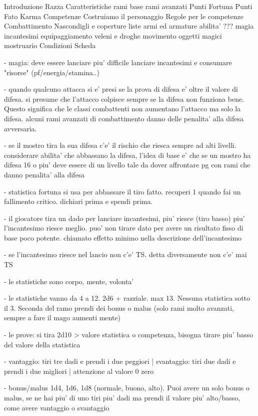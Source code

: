\documentclass[12pt,a4paper,twoside,openany,twocolumn]{book}
\begin{document}
Introduzione
Razza
Caratteristiche
rami base
rami avanzati
Punti Fortuna
Punti Fato
Karma
Competenze
Costruiamo il personaggio
Regole per le competenze
Combattimento
Nascondigli e coperture
liste armi ed armature
abilita' ???
magia
incantesimi
equipaggiamento
veleni e droghe
movimento
oggetti magici
mostruario
Condizioni
Scheda

- magia: deve essere lanciare piu' difficile lanciare incantesimi e consumare "risorse" (pf/energia/stamina..)

- quando qualcuno attacca si e' presi se la prova di difesa e' oltre il valore di difesa. si presume che l'attacco colpisce sempre se la difesa non funziona bene. Questo significa che le classi combattenti non aumentano l'attacco ma solo la difesa. alcuni rami avanzati di combattimento danno delle penalita' alla difesa avversaria.

- se il mostro tira la sua difesa c'e' il rischio che riesca sempre ad alti livelli. considerare abilita' che abbassano la difesa, l'idea di base e' che se un mostro ha difesa 16 o piu' deve essere di un livello tale da dover affrontare pg con rami che danno penalita' alla difesa

- statistica fortuna si usa per abbassare il tiro fatto. recuperi 1 quando fai un fallimento critico. dichiari prima e spendi prima.

- il giocatore tira un dado per lanciare incantesimi, piu' riesce (tiro basso) piu' l'incantesimo riesce meglio. puo' non tirare dato per avere un risultato fisso di base poco potente. chiamato effetto minimo nella descrizione dell'incantesimo

- se l'incantesimo riesce nel lancio non c'e' TS. detta diversamente non c'e' mai TS

- le statistiche sono corpo, mente, volonta'

- le statistiche vanno da 4 a 12. 2d6 + razziale. max 13. Nessuna statistica sotto il 3. Seconda del ramo prendi dei bonus o malus (solo rami molto avanzati, sempre a fare il mago aumenti mente)

- le prove: si tira 2d10 > valore statistica o competenza,  bisogna tirare piu' basso del valore della statistica

- vantaggio: tiri tre dadi e prendi i due peggiori  |  svantaggio: tiri due dadi e prendi i due migliori | attenzione al valore 0 zero

- bonus/malus 1d4, 1d6, 1d8 (normale, buono, alto). Puoi avere un solo bonus o malus, se ne hai piu' di uno tiri piu' dadi ma prendi il valore piu' alto/basso, come avere vantaggio o svantaggio
\end{document}

